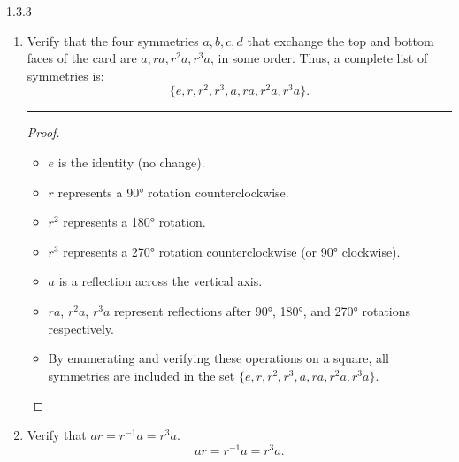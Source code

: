 \documentclass[12pt]{amsart}
\theoremstyle{definition}
\numberwithin{equation}{section}
\begin{document}
\begin{exercise}{1.3.3}
        \begin{enumerate}[label=\alph*.]
            \item Verify that the four symmetries \(a, b, c, d\) that exchange the top and bottom faces of the card are \(a, ra, r^2a, r^3a\), in some order. Thus, a complete list of symmetries is:
            \begin{equation*}
            \{e, r, r^2, r^3, a, ra, r^2a, r^3a\}.
            \end{equation*}
    \noindent\rule{\linewidth}{1pt}
            \begin{proof}\( \)
                \begin{itemize}[label=--]
                    \item \(e\) is the identity (no change).
                    \item \(r\) represents a 90° rotation counterclockwise.
                    \item \(r^2\) represents a 180° rotation.
                    \item \(r^3\) represents a 270° rotation counterclockwise (or 90° clockwise).
                    \item \(a\) is a reflection across the vertical axis.
                    \item \(ra\), \(r^2a\), \(r^3a\) represent reflections after 90°, 180°, and 270° rotations respectively.
                    \item By enumerating and verifying these operations on a square, all symmetries are included in the set \(\{e, r, r^2, r^3, a, ra, r^2a, r^3a\}\).
                \end{itemize}
                
            \end{proof}
            \item Verify that \(ar = r^{-1}a = r^3a\).
            \begin{equation*}
            ar = r^{-1}a = r^3a.
            \end{equation*}


\end{enumerate}
\end{exercise}
\end{document}
